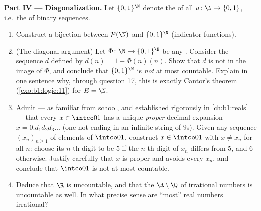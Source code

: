 \begin{problem}
\medskip
\noindent\textbf{Part IV --- Diagonalization.} Let $\{0,1\}^{\N}$
denote the  of all  $u \colon \N \to \{0, 1\}$, i.e.\ the 
of binary sequences.
\begin{enumerate}[resume]
  \item Construct a bijection between $\mathcal{P}(\N)$ and
        $\{0,1\}^{\N}$ (indicator functions).
  \item (The diagonal argument) Let $\Phi \colon \N \to
        \{0,1\}^{\N}$ be any . Consider the sequence $d$ defined
        by $d(n) = 1 - \Phi(n)(n)$. Show that $d$ is not in the
        image of $\Phi$, and conclude that $\{0,1\}^{\N}$ is
        \emph{not} at most countable. Explain in one sentence why,
        through question 17, this is exactly Cantor's theorem
        (\cref{exo:b1:logic:11}) for $E = \N$.
  \item Admit --- as familiar from school, and established
        rigorously in \cref{ch:b1:reals} --- that every $x \in
        \intco01$ has a unique \emph{proper} decimal expansion $x =
        0.d_1 d_2 d_3\dots$ (one not ending in an infinite string of
        $9$s). Given any sequence $(x_n)_{n \geq 1}$ of elements of
        $\intco01$, construct $x \in \intco01$ with $x \neq x_n$ for
        all $n$: choose its $n$-th digit to be $5$ if the $n$-th
        digit of $x_n$ differs from $5$, and $6$ otherwise. Justify
        carefully that $x$ is proper and avoids every $x_n$, and
        conclude that $\intco01$ is not at most countable.
  \item Deduce that $\R$ is uncountable, and that the  $\R
        \setminus \Q$ of irrational numbers is uncountable as well.
        In what precise sense are ``most'' real numbers irrational?
\end{enumerate}


\end{problem}
